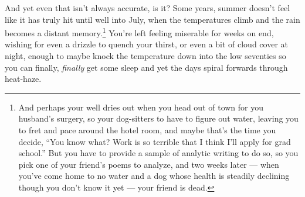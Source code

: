 \documentclass[12pt]{memoir}
\begin{document}
And yet even that isn't always accurate, is it? Some years, summer doesn't feel like it has truly hit until well into July, when the temperatures climb and the rain becomes a distant memory.\footnote{And perhaps your well dries out when you head out of town for you husband's surgery, so your dog-sitters to have to figure out water, leaving you to fret and pace around the hotel room, and maybe that's the time you decide, ``You know what? Work is so terrible that I think I'll apply for grad school.'' But you have to provide a sample of analytic writing to do so, so you pick one of your friend's poems to analyze, and two weeks later --- when you've come home to no water and a dog whose health is steadily declining though you don't know it yet --- your friend is dead.} You're left feeling miserable for weeks on end, wishing for even a drizzle to quench your thirst, or even a bit of cloud cover at night, enough to maybe knock the temperature down into the low seventies so you can finally, \emph{finally} get some sleep and yet the days spiral forwards through heat-haze.
\end{document}
